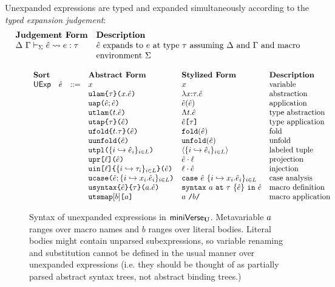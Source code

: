 Unexpanded expressions are typed and expanded simultaneously according to the \emph{typed expansion judgement}:
\[\begin{array}{ll}
\textbf{Judgement Form} & \textbf{Description}\\
\Delta~\Gamma \vdash_{\Sigma} \hat{e} \leadsto e : \tau & \text{$\hat{e}$ expands to $e$ at type $\tau$ assuming $\Delta$ and $\Gamma$ and macro}\\
& \text{environment $\Sigma$}
\end{array}\]

\begin{figure}
$\begin{array}{lllllll}
\textbf{Sort} & & & \textbf{Abstract Form} & \textbf{Stylized Form} & \textbf{Description}\\
\mathsf{UExp} & \hat{e} & ::= & x & x & \text{variable}\\
&&& \texttt{ulam}\texttt{\{}\tau\texttt{\}(}x.\hat{e}\texttt{)} & \lambda x{:}\tau.\hat{e} & \text{abstraction}\\
&&& \texttt{uap}\texttt{(}\hat{e}; \hat{e}\texttt{)} & \hat{e}(\hat{e}) & \text{application}\\
&&& \texttt{utlam}\texttt{(}t.\hat{e}\texttt{)} & \Lambda t.\hat{e} & \text{type abstraction}\\
&&& \texttt{utap}\texttt{\{}\tau\texttt{\}(}\hat{e}\texttt{)} & \hat{e}\texttt{[}\tau\texttt{]} & \text{type application}\\
&&& \texttt{ufold}\texttt{\{}t.\tau\texttt{\}(}\hat{e}\texttt{)} & \texttt{fold}(\hat{e}) & \text{fold}\\
&&& \texttt{uunfold}\texttt{(}\hat{e}\texttt{)} & \texttt{unfold}(\hat{e}) & \text{unfold}\\
&&& \texttt{utpl}\texttt{(}\{i \hookrightarrow \hat{e}_{i}\}_{i \in L}\texttt{)} & \langle \{i \hookrightarrow \hat{e}_{i}\}_{i \in L}\rangle & \text{labeled tuple}\\
&&& \texttt{upr}\texttt{[}\ell\texttt{](}\hat{e}\texttt{)} & \hat{e} \cdot \ell & \text{projection}\\
&&& \texttt{uin}\texttt{[}\ell\texttt{]\{}\{i \hookrightarrow \tau_{i}\}_{i \in L}\texttt{\}(}\hat{e}\texttt{)} & \ell \cdot \hat{e} & \text{injection}\\
&&& \texttt{ucase}\texttt{(}\hat{e}; \{i \hookrightarrow x_{i}.\hat{e}_{i}\}_{i \in L}\texttt{)} & \texttt{case}~\hat{e}~\{i \hookrightarrow x_{i}.\hat{e}_{i}\}_{i \in L} & \text{case analysis}\\
&&& \texttt{usyntax}\texttt{\{}\hat{e}\texttt{\}\{}\tau\texttt{\}(}a.\hat{e}\texttt{)} & \texttt{syntax}~a~\texttt{at}~\tau~\{\hat{e}\}~\texttt{in}~\hat{e} & \text{macro definition}\\
&&& \texttt{utsmap}[b]\texttt{[}a\texttt{]} & a~\texttt{/}b\texttt{/} & \text{macro application}
\end{array}$
\caption[Syntax of unexpanded expressions in $\miniVerseU$.]{Syntax of unexpanded expressions in $\miniVerseU$. Metavariable $a$ ranges over macro names and $b$ ranges over literal bodies. Literal bodies might contain unparsed subexpressions, so variable renaming and substitution cannot be defined in the usual manner over unexpanded expressions (i.e. they should be thought of as partially parsed abstract syntax trees, not abstract binding trees.)}
\label{fig:U-unexpanded-terms}
\end{figure}
